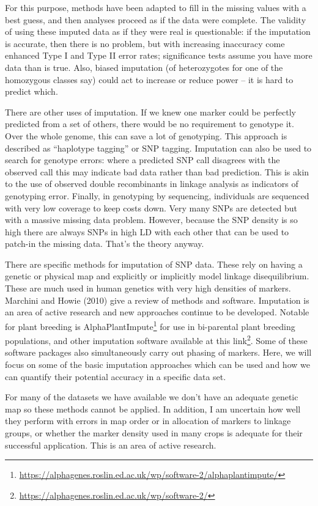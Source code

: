 \documentclass[
]{book}
\renewcommand{\href}[2]{#2\footnote{\url{#1}}}
\begin{document}
For this purpose, methods have been adapted to fill in the missing values with a best guess, and then analyses proceed as if the data were complete. The validity of using these imputed data as if they were real is questionable: if the imputation is accurate, then there is no problem, but with increasing inaccuracy come enhanced Type I and Type II error rates; significance tests assume you have more data than is true. Also, biased imputation (of heterozygotes for one of the homozygous classes say) could act to increase or reduce power -- it is hard to predict which.

There are other uses of imputation. If we knew one marker could be perfectly predicted from a set of others, there would be no requirement to genotype it. Over the whole genome, this can save a lot of genotyping. This approach is described as ``haplotype tagging'' or SNP tagging. Imputation can also be used to search for genotype errors: where a predicted SNP call disagrees with the observed call this may indicate bad data rather than bad prediction. This is akin to the use of observed double recombinants in linkage analysis as indicators of genotyping error. Finally, in genotyping by sequencing, individuals are sequenced with very low coverage to keep costs down. Very many SNPs are detected but with a massive missing data problem. However, because the SNP density is so high there are always SNPs in high LD with each other that can be used to patch-in the missing data. That's the theory anyway.

There are specific methods for imputation of SNP data. These rely on having a genetic or physical map and explicitly or implicitly model linkage disequilibrium. These are much used in human genetics with very high densities of markers. Marchini and Howie (2010) give a review of methods and software. Imputation is an area of active research and new approaches continue to be developed. Notable for plant breeding is \href{https://alphagenes.roslin.ed.ac.uk/wp/software-2/alphaplantimpute/}{AlphaPlantImpute} for use in bi-parental plant breeding populations, and other imputation software available at this \href{https://alphagenes.roslin.ed.ac.uk/wp/software-2/}{link}. Some of these software packages also simultaneously carry out phasing of markers. Here, we will focus on some of the basic imputation approaches which can be used and how we can quantify their potential accuracy in a specific data set.

For many of the datasets we have available we don't have an adequate genetic map so these methods cannot be applied. In addition, I am uncertain how well they perform with errors in map order or in allocation of markers to linkage groups, or whether the marker density used in many crops is adequate for their successful application. This is an area of active research.
\end{document}
